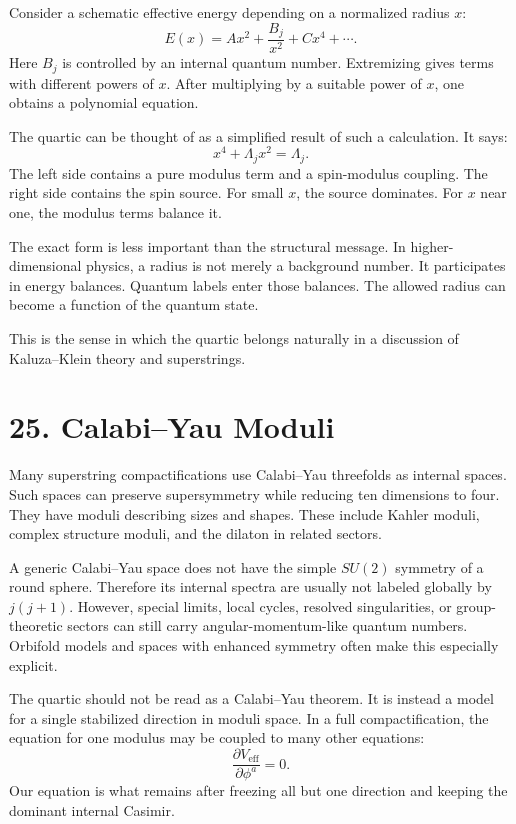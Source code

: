 \documentclass[11pt]{article}
\newcommand{\Lspin}{\Lambda_j}
\begin{document}
Consider a schematic effective energy depending on a normalized radius \(x\):
\[
        E(x)=A x^2+\frac{B_j}{x^2}+C x^4+\cdots .
\]
Here \(B_j\) is controlled by an internal quantum number. Extremizing gives terms with different powers of \(x\). After multiplying by a suitable power of \(x\), one obtains a polynomial equation.

The quartic can be thought of as a simplified result of such a calculation. It says:
\[
        x^4+\Lspin x^2=\Lspin .
\]
The left side contains a pure modulus term and a spin-modulus coupling. The right side contains the spin source. For small \(x\), the source dominates. For \(x\) near one, the modulus terms balance it.

The exact form is less important than the structural message. In higher-dimensional physics, a radius is not merely a background number. It participates in energy balances. Quantum labels enter those balances. The allowed radius can become a function of the quantum state.

This is the sense in which the quartic belongs naturally in a discussion of Kaluza--Klein theory and superstrings.


\section*{25. Calabi--Yau Moduli}

Many superstring compactifications use Calabi--Yau threefolds as internal spaces. Such spaces can preserve supersymmetry while reducing ten dimensions to four. They have moduli describing sizes and shapes. These include Kahler moduli, complex structure moduli, and the dilaton in related sectors.

A generic Calabi--Yau space does not have the simple \(SU(2)\) symmetry of a round sphere. Therefore its internal spectra are usually not labeled globally by \(j(j+1)\). However, special limits, local cycles, resolved singularities, or group-theoretic sectors can still carry angular-momentum-like quantum numbers. Orbifold models and spaces with enhanced symmetry often make this especially explicit.

The quartic should not be read as a Calabi--Yau theorem. It is instead a model for a single stabilized direction in moduli space. In a full compactification, the equation for one modulus may be coupled to many other equations:
\[
        \frac{\partial V_{\text{eff}}}{\partial \phi^a}=0 .
\]
Our equation is what remains after freezing all but one direction and keeping the dominant internal Casimir.
\end{document}
